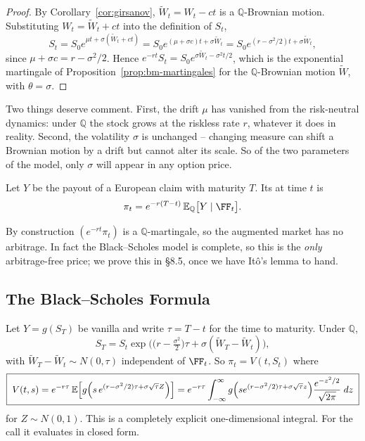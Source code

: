 \documentclass[a4paper]{scrartcl}
\newcommand{\QQ}{\mathbb{Q}}
\begin{document}
\begin{proof}
	By Corollary~\ref{cor:girsanov}, $\tilde W_t = W_t - ct$ is a $\QQ$-Brownian motion. Substituting $W_t = \tilde W_t + ct$ into the definition of $S_t$,
	$$
	S_t = S_0 e^{\mu t + \sigma(\tilde W_t + ct)} = S_0 e^{(\mu + \sigma c)t + \sigma\tilde W_t} = S_0e^{(r-\sigma^2/2)t + \sigma\tilde W_t},
	$$
	since $\mu + \sigma c = r - \sigma^2/2$. Hence $e^{-rt}S_t = S_0e^{\sigma\tilde W_t - \sigma^2t/2}$, which is the exponential martingale of Proposition~\ref{prop:bm-martingales} for the $\QQ$-Brownian motion $\tilde W$, with $\theta = \sigma$.
\end{proof}

Two things deserve comment. First, the drift $\mu$ has vanished from the risk-neutral dynamics: under $\QQ$ the stock grows at the riskless rate $r$, whatever it does in reality. Second, the volatility $\sigma$ is unchanged -- changing measure can shift a Brownian motion by a drift but cannot alter its scale. So of the two parameters of the model, only $\sigma$ will appear in any option price.

\begin{definition}
	Let $Y$ be the payout of a European claim with maturity $T$. Its  at time $t$ is
	$$
	\pi_t = e^{-r(T-t)}\,\EE_\QQ\big[Y \mid \FF_t\big].
	$$
\end{definition}

By construction $(e^{-rt}\pi_t)$ is a $\QQ$-martingale, so the augmented market has no arbitrage. In fact the Black--Scholes model is complete, so this is the \emph{only} arbitrage-free price; we prove this in \S8.5, once we have It\^o's lemma to hand.

\subsection{The Black--Scholes Formula}

Let $Y = g(S_T)$ be vanilla and write $\tau = T-t$ for the time to maturity. Under $\QQ$,
$$
S_T = S_t\exp\Big(\big(r-\tfrac{\sigma^2}{2}\big)\tau + \sigma(\tilde W_T - \tilde W_t)\Big),
$$
with $\tilde W_T - \tilde W_t \sim N(0,\tau)$ independent of $\FF_t$. So $\pi_t = V(t,S_t)$ where
$$
\boxed{\;V(t,s) = e^{-r\tau}\,\mathbb{E}\Big[g\Big(s\,e^{(r-\sigma^2/2)\tau + \sigma\sqrt\tau Z}\Big)\Big] = e^{-r\tau}\int_{-\infty}^\infty g\Big(se^{(r-\sigma^2/2)\tau+\sigma\sqrt\tau z}\Big)\frac{e^{-z^2/2}}{\sqrt{2\pi}}\; d z\;}
$$
for $Z \sim N(0,1)$. This is a completely explicit one-dimensional integral. For the call it evaluates in closed form.
\end{document}
